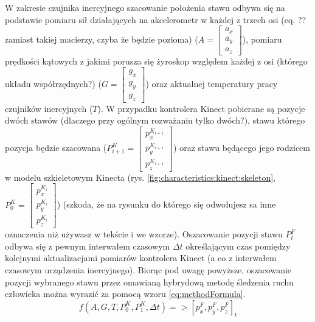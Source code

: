 W zakresie czujnika inercyjnego szacowanie położenia stawu odbywa się na podstawie pomiaru sił działających na akcelerometr w każdej z trzech osi 
(eq. ?? zamiast takiej macierzy, czyba że będzie pozioma) 
($A = \begin{bmatrix}a_x\\a_y\\a_z\end{bmatrix}$), pomiaru prędkości kątowych z jakimi porusza się żyroskop względem każdej z osi (którego układu współrzędnych?) ($G = \begin{bmatrix}g_x\\g_y\\g_z\end{bmatrix}$) oraz aktualnej temperatury pracy czujników inercyjnych ($T$). W przypadku kontrolera Kinect pobierane są pozycje dwóch stawów (dlaczego przy ogólnym rozważaniu tylko dwóch?), stawu którego pozycja będzie szacowana ($P^K_{i+1} = \begin{bmatrix}p^{K_{i+1}}_x\\p^{K_{i+1}}_y\\p^{K_{i+1}}_z\end{bmatrix}$) oraz stawu będącego jego rodzicem w modelu szkieletowym Kinecta (rys. \ref{fig:characteristics:kinect:skeleton}, $P^K_0 = \begin{bmatrix}p^{K_i}_x\\p^{K_i}_y\\p^{K_i}_z\end{bmatrix}$) (szkoda, że na rysunku do którego się odwołujesz sa inne oznaczenia niż używasz w tekście i we wzorze). Oszacowanie pozycji stawu $P^F_t$ odbywa się z pewnym interwałem czasowym $\Delta t$ określającym czas pomiędzy kolejnymi aktualizacjami pomiarów kontrolera Kinect (a co z interwałem czasowym urządzenia inercyjnego). Biorąc pod uwagę powyższe, oszacowanie pozycji wybranego stawu przez omawianą hybrydową metodę śledzenia ruchu człowieka można wyrazić za pomocą wzoru \eqref{eq:methodFormula}.
\begin{equation}
	f(A,G,T,P_0^K,P_1^K,\Delta t) => [p_x^F,p_y^F,p_z^F]_t
	\label{eq:methodFormula}
\end{equation}


